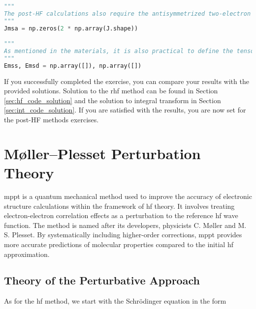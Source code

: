 \begin{lstlisting}[language=Python, caption={Integral transform exercise code.}, label=code:int_exercise]
"""
The post-HF calculations also require the antisymmetrized two-electron integrals in the molecular spinorbital basis. These integrals are essential for the MP2 and CC calculations. Please define the "Jmsa" tensor as the antisymmetrized two-electron integrals in the molecular spinorbital basis.
"""
Jmsa = np.zeros(2 * np.array(J.shape))

"""
As mentioned in the materials, it is also practical to define the tensors of reciprocal orbital energy differences in the molecular spinorbital basis. These tensors are essential for the MP2 and CC calculations. Please define the "Emss", "Emsd" and "Emst" tensors as tensors of single, double and triple excitation energies, respectively. The configuration interaction will not need these tensors, so you can skip this step if you don't plan to program the CI method. The MP methods will require only the "Emsd" tensor, while the CC method will need both tensors.
"""
Emss, Emsd = np.array([]), np.array([])
\end{lstlisting}

If you successfully completed the exercise, you can compare your results with the provided solutions. Solution to the \acrshort{rhf} method can be found in Section \ref{sec:hf_code_solution} and the solution to integral transform in Section \ref{sec:int_code_solution}. If you are satisfied with the results, you are now set for the post-HF methods exercises.
\chapter{Møller--Plesset Perturbation Theory}

\acrfull{mppt} is a quantum mechanical method used to improve the accuracy of electronic structure calculations within the framework of \acrshort{hf} theory. It involves treating electron-electron correlation effects as a perturbation to the reference \acrshort{hf} wave function. The method is named after its developers, physicists C. Møller and M. S. Plesset. By systematically including higher-order corrections, \acrshort{mppt} provides more accurate predictions of molecular properties compared to the initial \acrshort{hf} approximation.

\section{Theory of the Perturbative Approach}

As for the \acrshort{hf} method, we start with the Schrödinger equation in the form

